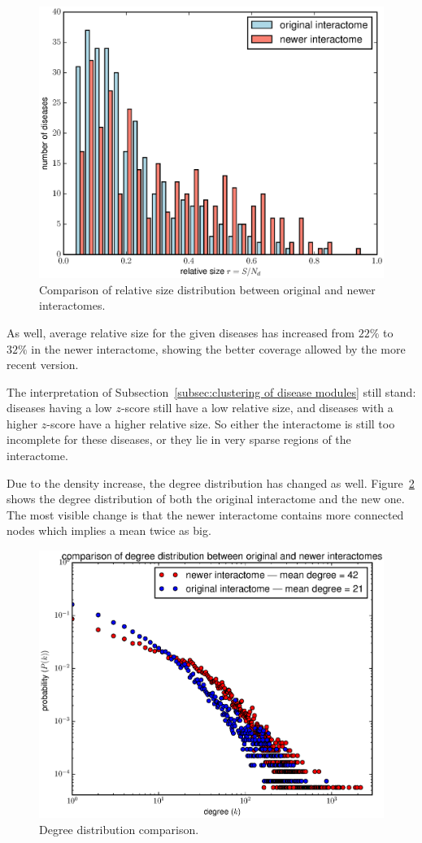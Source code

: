 \documentclass[letterpaper]{article}
\begin{document}
	\begin{figure}[!h]
		\includegraphics[width=.5\textwidth]{images/rel_sizes_comparison.eps}
		\caption{Comparison of relative size distribution between original and newer interactomes.\label{fig:rel sizes comparison}}
	\end{figure}

	As well, average relative size for the given diseases has increased from $22\%$ to $32\%$ in the newer interactome,
	showing the better coverage allowed by the more recent version.

	The interpretation of Subsection~\ref{subsec:clustering of disease modules} still stand: diseases having a low $z$-score still
	have a low relative size, and diseases with a higher $z$-score have a higher relative size. So either the interactome is still
	too incomplete for these diseases, or they lie in very sparse regions of the interactome.

	Due to the density increase, the degree distribution has changed as well. Figure~\ref{fig:degree distribution comparison}
	shows the degree distribution of both the original interactome and the new one. The most visible change is that the newer
	interactome contains more connected nodes which implies a mean twice as big.

	\begin{figure}[!h]
		\includegraphics[width=.5\textwidth]{images/degree_distributions_comparison.eps}
		\caption{Degree distribution comparison.\label{fig:degree distribution comparison}}
	\end{figure}
\end{document}
